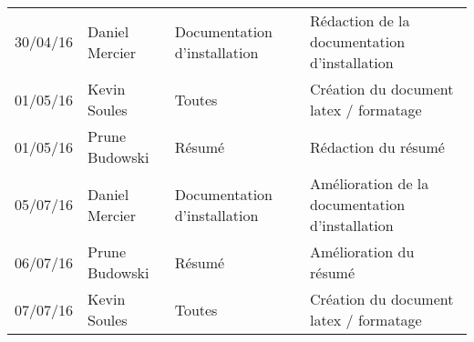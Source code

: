 \small
\begin{tabular}{|p{1.5cm}| >{\raggedright}p{2.9cm}| >{\raggedright}p{3.2cm}|p{7.2cm}|}
  \hline
  \rowcolor{Gainsboro} \color{Navy}{\bfseries Date}  & \color{Navy}{\bfseries Auteur} & \color{Navy}{\bfseries Section(s)}  &\color{Navy}{\bfseries Commentaires} \\
  \hline
  30/04/16 & Daniel Mercier & Documentation d'installation & Rédaction de la documentation d'installation\\
  \hline
  01/05/16 & Kevin Soules & Toutes  & Création du document latex / formatage\\
  \hline
  01/05/16 & Prune Budowski & Résumé & Rédaction du résumé\\
  \hline
  05/07/16 & Daniel Mercier & Documentation d'installation & Amélioration de la documentation d'installation\\
  \hline
  06/07/16 & Prune Budowski & Résumé & Amélioration du résumé\\
  \hline
  07/07/16 & Kevin Soules & Toutes  & Création du document latex / formatage\\
  \hline
\end{tabular}
\normalsize
